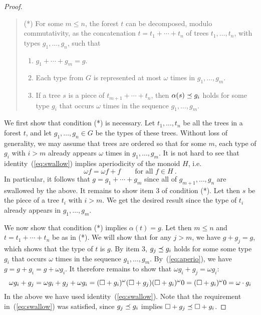\documentclass{LMCS}
\begin{document}
{\begin{proof}
 \begin{quote}
(*) For some $m \le n$, the forest $t$ can be decomposed, modulo
    commutativity, as the concatenation $t=t_1+\cdots+t_n$ of trees
    $t_1,\ldots,t_n$, with types $g_1,\ldots,g_n$, such that
  \begin{enumerate}
\item $g_1+\cdots+g_m=g$.
\item Each type from $G$ is represented at most $\omega$ times in
$g_1,\ldots,g_m$.
  \item If a tree $s$ is a piece of $t_{m+1}+\cdots + t_n$, then
    $\alpha(s) \preceq g_i$ holds for some type $g_i$ that occurs
    $\omega$ times in the sequence $g_1,\ldots,g_m$.
  \end{enumerate}
  \end{quote}

We first show that condition (*) is necessary. Let $t_1,\ldots,t_n$ be
all the trees in a forest $t$, and let $g_1,\ldots,g_n \in G$ be
the types of these trees.  Without loss of generality, we may assume
that trees are ordered so that for some $m$, each type of $g_i$ with
$i > m$ already appears $\omega$ times in $g_1,\ldots,g_m$. It is not hard to see that identity~(\ref{eq:swallow}) implies aperiodicity of the monoid $H$, i.e.~
\begin{equation}\label{eq:aperio}
\omega f = \omega f + f \qquad \mbox{for all }f \in H\ .
\end{equation} 
In particular, it follows that $g=g_1+\cdots +g_m$ since all of
$g_{m+1},\ldots,g_n$ are swallowed by the above. It remains to show
item 3 of condition (*). Let then $s$ be the piece of a tree $t_i$
with $i>m$. We get the desired result since the type of $t_i$ already
appears in $g_1,\ldots,g_m$.

We now show that condition (*) implies $\alpha(t)=g$. Let then $m \le
n$ and $t=t_1+\cdots+t_n$ be as in (*). We will show that for any $j >
m$, we have $g+g_j=g$, which shows that the type of $t$ is $g$. By
item 3, $g_j \preceq g_i$ holds for some some type $g_i$ that occurs
$\omega$ times in the sequence $g_1,\ldots,g_m$. By~(\ref{eq:aperio}),
we have $g=g+g_i=g+ \omega g_i$. It therefore remains to show
that $\omega g_i + g_j = \omega g_i$:
\[
\omega g_i + g_j = \omega g_i + g_j + \omega  g_i =\\
(\Box + g_i)^\omega(\Box + g_j) (\Box + g_i)^\omega 0 = (\Box +
g_i)^\omega 0 = \omega \cdot g_i
\]
In the above we have used identity~(\ref{eq:swallow}). Note that the
requirement in~(\ref{eq:swallow}) was satisfied, since $g_j \preceq
g_i$ implies $\Box + g_j \preceq \Box+g_i$.



\end{proof}}
\end{document}
